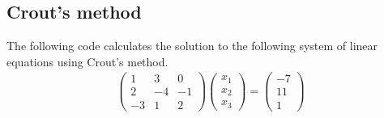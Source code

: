 \documentclass[letterpaper,10pt,english]{jupyterBook}
\begin{document}
\subsection{Crout’s method}
\label{\detokenize{8_Appendices/8.1_Python:crout-s-method}}
\sphinxAtStartPar
The following code calculates the solution to the following system of linear equations using Crout’s method.
\begin{align*}
    \begin{pmatrix}
        1 & 3 & 0 \\
        2 & -4 & -1 \\
        -3 & 1 & 2
    \end{pmatrix}
    \begin{pmatrix} x_1 \\ x_2 \\ x_3 \end{pmatrix} 
    = \begin{pmatrix} -7 \\ 11 \\ 1 \end{pmatrix}
\end{align*}
\end{document}
